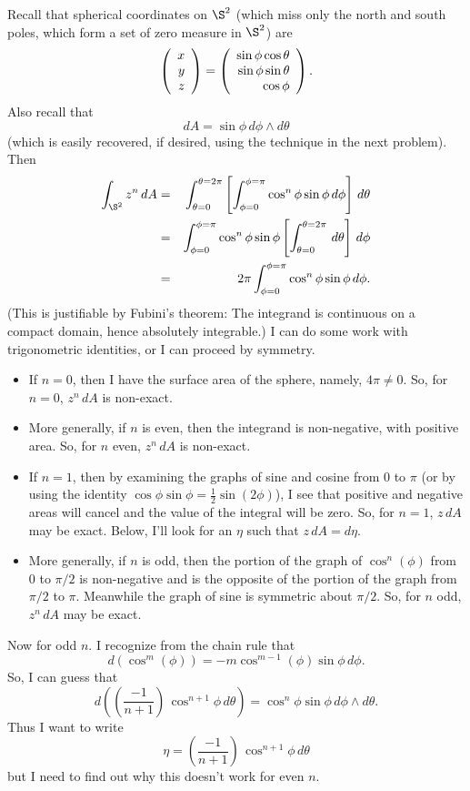 \documentclass[10pt]{article}
\numberwithin{equation}{subsection}
\begin{document}
Recall that spherical coordinates on $\S^2$ (which miss only the north and
south poles, which form a set of zero measure in $\S^2$) are
$$
	\left(\begin{array}{r} x \\ y \\ z\end{array}\right) = \left(\begin{array}{r} \sin\phi\cos\theta \\ \sin\phi\sin\theta \\ \cos\phi\end{array}\right).
$$
Also recall that
$$
	dA = \sin\phi\, d\phi\wedge d\theta
$$
(which is easily recovered, if desired, using the technique in the next
problem).
Then
\begin{eqnarray*}
	\int_{\S^2} z^n\, dA
	&=& \int_{\theta=0}^{\theta=2\pi} \left[\int_{\phi=0}^{\phi=\pi}
		\cos^n\phi \sin\phi \,d\phi\right] \,d\theta \\
	&=&
	\int_{\phi=0}^{\phi=\pi}
		\cos^n\phi \sin\phi
		\left[ \int_{\theta=0}^{\theta=2\pi} \,d\theta \right]
		\,d\phi \\
	&=& 2\pi
	\int_{\phi=0}^{\phi=\pi} \cos^n\phi \sin\phi \,d\phi.
\end{eqnarray*}
(This is justifiable by Fubini's theorem:  The integrand is continuous on a
compact domain, hence absolutely integrable.) I can do some work with
trigonometric identities, or I can proceed by symmetry.
\begin{itemize}

\item If $n=0$, then I have the surface area of the sphere, namely, $4\pi \ne
0$.  So, for $n=0$, $z^n\,dA$ is non-exact.

\item More generally, if $n$ is even, then the integrand is non-negative, with
positive area.  So, for $n$ even, $z^n\,dA$ is non-exact.

\item If $n=1$, then by examining the graphs of sine and cosine from $0$ to
$\pi$ (or by using the identity $\cos\phi\sin\phi = \frac{1}{2}\sin(2\phi)$), I
see that positive and negative areas will cancel and the value of the integral
will be zero.  So, for $n=1$, $z\,dA$ may be exact.  Below, I'll look for an
$\eta$ such that $z\,dA = d\eta$.

\item More generally, if $n$ is odd, then the portion of the graph of
$\cos^n(\phi)$ from $0$ to $\pi/2$ is non-negative and is the opposite of the
portion of the graph from $\pi/2$ to $\pi$.  Meanwhile the graph of sine is
symmetric about $\pi/2$.  So, for $n$ odd, $z^n\,dA$ may be exact.

\end{itemize}

Now for odd $n$.  I recognize from the chain rule that
$$
	d(\cos^m(\phi)) = -m \cos^{m-1}(\phi) \sin\phi\,d\phi.
$$
So, I can guess that
$$
	d\left(\left(\frac{-1}{n+1}\right)\,\cos^{n+1}\phi\,d\theta\right) =
	\cos^n\phi\sin\phi\,d\phi\wedge d\theta.
$$
Thus I want to write
$$
	\eta=\left(\frac{-1}{n+1}\right)\,\cos^{n+1}\phi\,d\theta
$$
but I need to find out why this doesn't work for even $n$.
\end{document}
